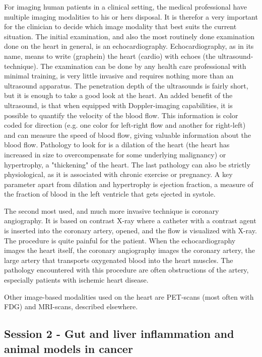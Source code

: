 \documentclass[12p]{article}
\begin{document}
For imaging human patients in a clinical setting, the medical professional have multiple imaging modalities to his or hers disposal.
It is therefor a very important for the clinician to decide which image modality that best suits the current situation.
The initial examination, and also the most routinely done examination done on the heart in general, is an echocardiography.
Echocardiography, as in its name, means to write (graphein) the heart (cardio) with echoes (the ultrasound-technique).
The examination can be done by any health care professional with minimal training, is very little invasive and requires nothing more than an ultrasound apparatus.
The penetration depth of the ultrasounds is fairly short, but it is enough to take a good look at the heart.
An added benefit of the ultrasound, is that when equipped with Doppler-imaging capabilities, it is possible to quantify the velocity of the blood flow.
This information is color coded for direction (e.g. one color for left-right flow and another for right-left) and can measure the speed of blood flow, giving valuable information about the blood flow.
Pathology to look for is a dilation of the heart (the heart has increased in size to overcompensate for some underlying malignancy) or hypertrophy, a "thickening" of the heart.
The last pathology can also be strictly physiological, as it is associated with chronic exercise or pregnancy.
A key parameter apart from dilation and hypertrophy is ejection fraction, a measure of the fraction of blood in the left ventricle that gets ejected in systole.

The second most used, and much more invasive technique is coronary angiography.
It is based on contrast X-ray where a catheter with a contrast agent is inserted into the coronary artery, opened, and the flow is visualized with X-ray.
The procedure is quite painful for the patient.
When the echocardiography images the heart itself, the coronary angiography images the coronary artery, the large artery that transports oxygenated blood into the heart muscles.
The pathology encountered with this procedure are often obstructions of the artery, especially patients with ischemic heart disease. 

Other image-based modalities used on the heart are PET-scans (most often with FDG) and MRI-scans, described elsewhere.

\subsection*{Session 2 - Gut and liver inflammation and animal models in cancer}
\end{document}
